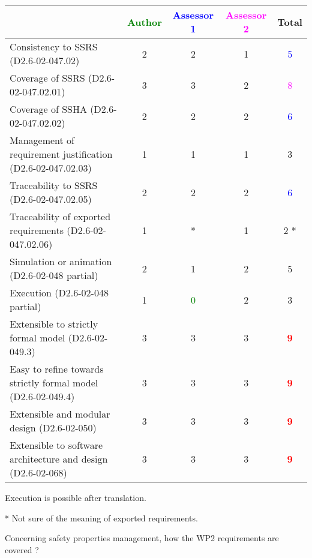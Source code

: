\begin{tabular}{|l | c | c | c | c|}
\hline
& \textcolor{green}{Author} & \textcolor{blue}{Assessor 1} & \textcolor{magenta}{Assessor 2} & Total \\
\hline 
Consistency to SSRS (D2.6-02-047.02) & 2     & 2     & 1     & \textcolor{blue}{5} \\
\hline
Coverage of SSRS (D2.6-02-047.02.01)  & 3     & 3     & 2     & \textcolor{magenta}{8} \\
\hline
Coverage of SSHA (D2.6-02-047.02.02)  & 2     & 2     & 2     & \textcolor{blue}{6} \\
\hline
Management of requirement justification (D2.6-02-047.02.03)  & 1     & 1     & 1     & 3     \\
\hline
Traceability to  SSRS (D2.6-02-047.02.05)  & 2     & 2     & 2     & \textcolor{blue}{6} \\
\hline
Traceability of exported requirements (D2.6-02-047.02.06)  & 1     & * & 1     & 2    * \\
\hline
Simulation or animation (D2.6-02-048 partial)  & 2     & 1     & 2     &  5 \\
\hline
Execution (D2.6-02-048 partial)  & 1     & \textcolor{green}{0} & 2     & 3     \\
\hline
Extensible to strictly formal model (D2.6-02-049.3) & 3     & 3     & 3     & \textcolor{red}{\textbf{9}}  \\
\hline
Easy to  refine towards strictly formal model (D2.6-02-049.4) & 3     & 3     & 3     & \textcolor{red}{\textbf{9}}  \\
\hline
Extensible and modular design (D2.6-02-050)  & 3     & 3     & 3     & \textcolor{red}{\textbf{9}} \\
\hline
Extensible to software architecture and design (D2.6-02-068)   & 3     & 3     & 3     & \textcolor{red}{\textbf{9}} \\
\hline
\end{tabular}


\begin{author_comment}
Execution is possible after translation.
\end{author_comment}
\begin{assessor1}
* Not sure of the meaning of exported requirements.
\end{assessor1}

Concerning safety properties management, how the WP2 requirements are covered ?

